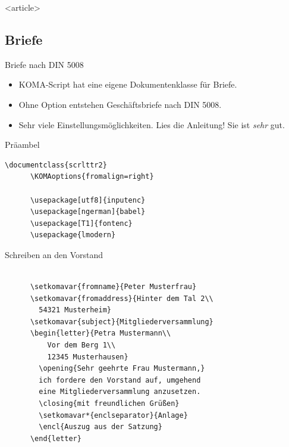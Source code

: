 \mode
<article>


\subsection{Briefe}

\begin{Frame}[fragile]{Briefe nach DIN 5008}
  \begin{itemize}
    \item KOMA-Script hat eine eigene Dokumentenklasse für Briefe.
    \item Ohne Option entstehen Geschäftsbriefe nach DIN 5008.
    \item Sehr viele Einstellungsmöglichkeiten. \newline
      \alert{Lies die Anleitung!} Sie ist \emph{sehr} gut.
  \end{itemize}

  \xxx

  \begin{Block}{Präambel}
    \begin{lstlisting}[style=block,gobble=6]
      \documentclass{scrlttr2}
      \KOMAoptions{fromalign=right}

      \usepackage[utf8]{inputenc}
      \usepackage[ngerman]{babel}
      \usepackage[T1]{fontenc}
      \usepackage{lmodern}
     \end{lstlisting}
  \end{Block}
\end{Frame}

\begin{Frame}[fragile]{Schreiben an den Vorstand}
  \begin{lstlisting}[gobble=4]
    
      \setkomavar{fromname}{Peter Musterfrau}
      \setkomavar{fromaddress}{Hinter dem Tal 2\\
        54321 Musterheim}
      \setkomavar{subject}{Mitgliederversammlung}
      \begin{letter}{Petra Mustermann\\
          Vor dem Berg 1\\
          12345 Musterhausen}
        \opening{Sehr geehrte Frau Mustermann,}
        ich fordere den Vorstand auf, umgehend
        eine Mitgliederversammlung anzusetzen.
        \closing{mit freundlichen Grüßen}
        \setkomavar*{enclseparator}{Anlage}
        \encl{Auszug aus der Satzung}
      \end{letter}
    
  \end{lstlisting}
\end{Frame}

